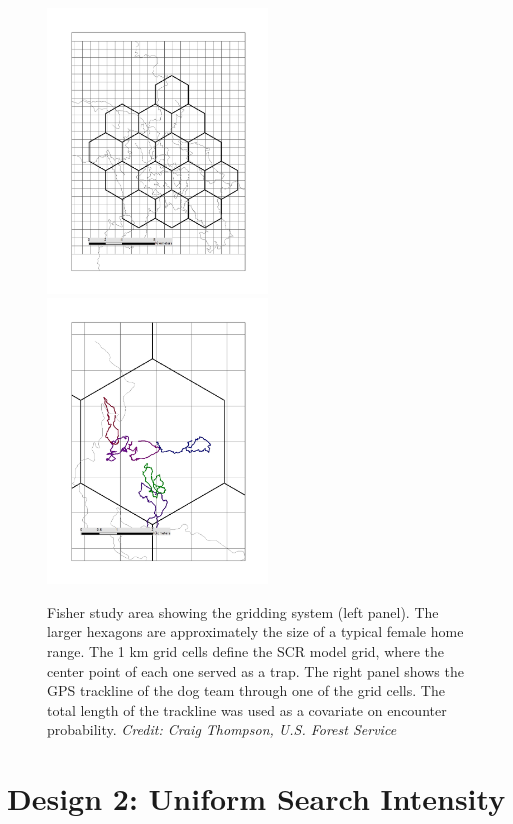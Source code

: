 \begin{figure}
\centering
\includegraphics[width=2.3in]{Ch15-searchencounter/figs/fisher_map.jpg} 
\includegraphics[width=2.3in]{Ch15-searchencounter/figs/fisher_tracklog.jpg} 
\caption{
Fisher study area showing the gridding system (left panel). The larger
hexagons are approximately the size of a typical female home
range. The 1 km grid cells define the SCR model grid, where the center
point of each one served as a trap. The right panel shows the GPS
trackline of the dog team through one of the grid cells. The total
length of the trackline was used as a covariate on encounter probability.
{\it Credit: Craig Thompson, U.S. Forest Service}
}
\label{searchencounter.fig.fisherstudy}
\end{figure}






\section{Design 2: Uniform Search Intensity}

